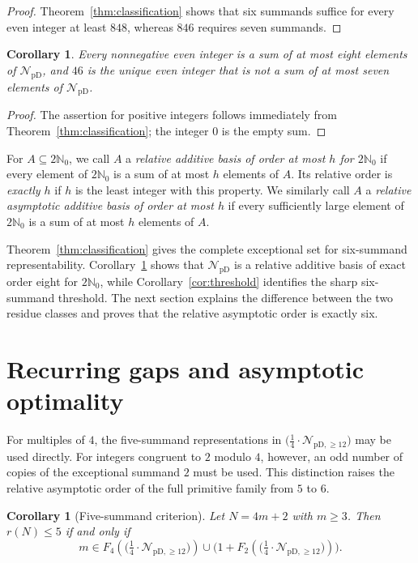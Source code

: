 \documentclass[12pt]{article}
\theoremstyle{plain}
\newtheorem{corollary}[theorem]{Corollary}
\theoremstyle{definition}
\theoremstyle{plain}
\newcommand{\NpD}{\mathcal{N}_{\mathrm{pD}}}
\newcommand{\Pset}{%
  \bigl(\tfrac{1}{4}\cdot\mathcal{N}_{\mathrm{pD},\geq 12}\bigr)%
}
\begin{document}
\begin{proof}
Theorem~\ref{thm:classification} shows that six summands suffice for every
even integer at least $848$, whereas $846$ requires seven summands.
\end{proof}

\begin{corollary}\label{cor:eight}
Every nonnegative even integer is a sum of at most eight elements of
$\NpD$, and $46$ is the unique even integer that is not a sum of at most
seven elements of $\NpD$.
\end{corollary}

\begin{proof}
The assertion for positive integers follows immediately from
Theorem~\ref{thm:classification}; the integer $0$ is the empty sum.
\end{proof}

For $A\subseteq2\mathbb N_0$, we call $A$ a \emph{relative additive basis of
order at most $h$ for $2\mathbb N_0$} if every element of $2\mathbb N_0$ is a
sum of at most $h$ elements of $A$.  Its relative order is \emph{exactly $h$}
if $h$ is the least integer with this property.  We similarly call $A$ a
\emph{relative asymptotic additive basis of order at most $h$} if every
sufficiently large element of $2\mathbb N_0$ is a sum of at most $h$ elements
of $A$.

Theorem~\ref{thm:classification} gives the complete exceptional set for
six-summand representability.  Corollary~\ref{cor:eight} shows that $\NpD$ is
a relative additive basis of exact order eight for $2\mathbb N_0$, while
Corollary~\ref{cor:threshold} identifies the sharp six-summand threshold.
The next section explains the difference between the two residue classes and
proves that the relative asymptotic order is exactly six.

\section{Recurring gaps and asymptotic optimality}\label{sec:asymptotic}

For multiples of $4$, the five-summand representations in $\Pset$ may be
used directly.  For integers congruent to $2$ modulo $4$, however, an odd
number of copies of the exceptional summand $2$ must be used.  This
distinction raises the relative asymptotic order of the full primitive
family from $5$ to $6$.

\begin{corollary}[Five-summand criterion]\label{cor:fivecrit}
Let $N=4m+2$ with $m\geq3$.  Then $r(N)\leq5$ if and only if
\begin{equation}\label{eq:fivecrit}
 m\in F_4(\Pset)\cup\bigl(1+F_2(\Pset)\bigr).
\end{equation}
\end{corollary}
\end{document}
